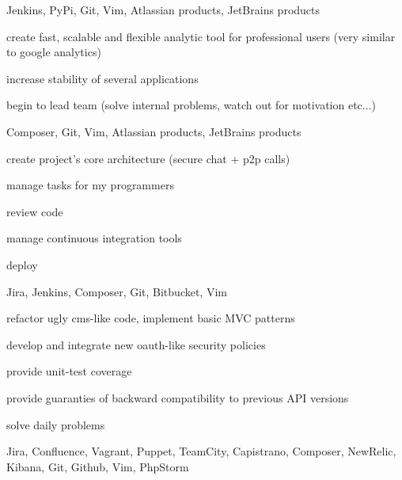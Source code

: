 \documentclass{cv}
\begin{document}
    \devtools
      Jenkins, PyPi, Git, Vim, Atlassian products, JetBrains products

    \begin{gaas}
      \item create fast, scalable and flexible analytic tool for professional
        users (very similar to google analytics)
      \item increase stability of several applications
      \item begin to lead team (solve internal problems, watch out for
        motivation etc...)
    \end{gaas}
    \devtools
      Composer, Git, Vim, Atlassian products, JetBrains products

  \pagebreak
    \begin{gaas}
      \item create project's core architecture (secure chat + p2p calls)
      \item manage tasks for my programmers
      \item review code
      \item manage continuous integration tools
      \item deploy
    \end{gaas}
    \devtools
      Jira, Jenkins, Composer, Git, Bitbucket, Vim

    \begin{gaas}
      \item refactor ugly cms-like code, implement basic MVC patterns
      \item develop and integrate new oauth-like security policies
      \item provide unit-test coverage
      \item provide guaranties of backward compatibility to previous API
        versions
      \item solve daily problems
    \end{gaas}
    \devtools
      Jira, Confluence, Vagrant, Puppet, TeamCity, Capistrano, Composer,
      NewRelic, Kibana, Git, Github, Vim, PhpStorm
\end{document}
